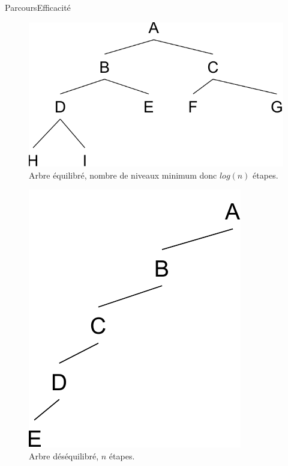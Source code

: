 \documentclass[12pt,a4paper]{beamer}
\begin{document}
\begin{frame}{Parcours}{Efficacité}
\begin{figure}
\includegraphics[scale=0.3]{figs/eq_abr}
\caption{Arbre équilibré, nombre de niveaux minimum donc $log(n)$ étapes.}
\end{figure}

\begin{figure}
\includegraphics[scale=0.3]{figs/deq_abr}
\caption{Arbre déséquilibré, $n$ étapes.}
\end{figure}
\end{frame}
\end{document}
